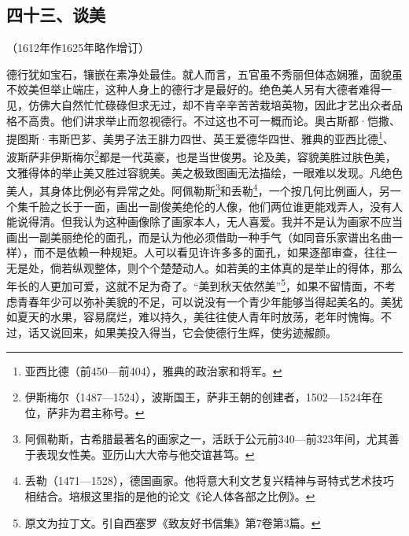 \subsection*{四十三、谈美}
\begin{center}
    （1612年作1625年略作增订）
\end{center}
\par 德行犹如宝石，镶嵌在素净处最佳。就人而言，五官虽不秀丽但体态娴雅，面貌虽不姣美但举止端庄，这种人身上的德行才是最好的。绝色美人另有大德者难得一见，仿佛大自然忙忙碌碌但求无过，却不肯辛辛苦苦栽培英物，因此才艺出众者品格不高贵。他们讲求举止而忽视德行。不过这也不可一概而论。奥古斯都·恺撒、提图斯·韦斯巴芗、美男子法王腓力四世、英王爱德华四世、雅典的亚西比德\footnote{亚西比德（前450—前404），雅典的政治家和将军。}、波斯萨非伊斯梅尔\footnote{伊斯梅尔（1487—1524），波斯国王，萨非王朝的创建者，1502—1524年在位，萨非为君主称号。}都是一代英豪，也是当世俊男。论及美，容貌美胜过肤色美，文雅得体的举止美又胜过容貌美。美之极致图画无法描绘，一眼难以发现。凡绝色美人，其身体比例必有异常之处。阿佩勒斯\footnote{阿佩勒斯，古希腊最著名的画家之一，活跃于公元前340—前323年间，尤其善于表现女性美。亚历山大大帝与他交谊甚笃。}和丢勒\footnote{丢勒（1471—1528），德国画家。他将意大利文艺复兴精神与哥特式艺术技巧相结合。培根这里指的是他的论文《论人体各部之比例》。}，一个按几何比例画人，另一个集千脸之长于一面，画出一副俊美绝伦的人像，他们两位谁更能戏弄人，没有人能说得清。但我认为这种画像除了画家本人，无人喜爱。我并不是认为画家不应当画出一副美丽绝伦的面孔，而是认为他必须借助一种手气（如同音乐家谱出名曲一样），而不是依赖一种规矩。人可以看见许许多多的面孔，如果逐部审查，往往一无是处，倘若纵观整体，则个个楚楚动人。如若美的主体真的是举止的得体，那么年长的人更加可爱，这就不足为奇了。“美到秋天依然美”\footnote{原文为拉丁文。引自西塞罗《致友好书信集》第7卷第3篇。}，如果不留情面，不考虑青春年少可以弥补美貌的不足，可以说没有一个青少年能够当得起美名的。美犹如夏天的水果，容易腐烂，难以持久，美往往使人青年时放荡，老年时愧悔。不过，话又说回来，如果美投入得当，它会使德行生辉，使劣迹赧颜。




